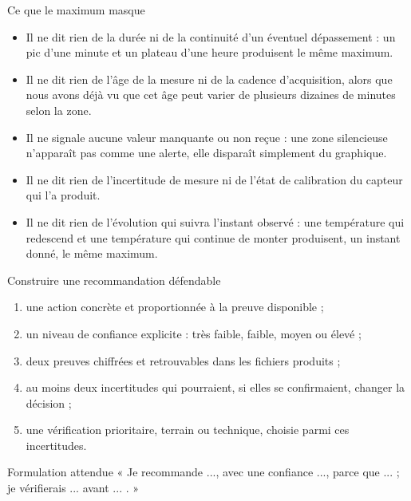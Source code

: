 \documentclass[aspectratio=169]{beamer}
\begin{document}
\begin{frame}{Ce que le maximum masque}
  \begin{itemize}
    \item Il ne dit rien de la durée ni de la continuité d'un éventuel dépassement : un pic d'une minute et un plateau d'une heure produisent le même maximum.
    \item Il ne dit rien de l'âge de la mesure ni de la cadence d'acquisition, alors que nous avons déjà vu que cet âge peut varier de plusieurs dizaines de minutes selon la zone.
    \item Il ne signale aucune valeur manquante ou non reçue : une zone silencieuse n'apparaît pas comme une alerte, elle disparaît simplement du graphique.
    \item Il ne dit rien de l'incertitude de mesure ni de l'état de calibration du capteur qui l'a produit.
    \item Il ne dit rien de l'évolution qui suivra l'instant observé : une température qui redescend et une température qui continue de monter produisent, un instant donné, le même maximum.
  \end{itemize}
\end{frame}

\begin{frame}{Construire une recommandation défendable}
  \begin{enumerate}
    \item une action concrète et proportionnée à la preuve disponible ;
    \item un niveau de confiance explicite : très faible, faible, moyen ou élevé ;
    \item deux preuves chiffrées et retrouvables dans les fichiers produits ;
    \item au moins deux incertitudes qui pourraient, si elles se confirmaient, changer la décision ;
    \item une vérification prioritaire, terrain ou technique, choisie parmi ces incertitudes.
  \end{enumerate}
  \begin{alertblock}{Formulation attendue}
    « Je recommande ..., avec une confiance ..., parce que ... ; je vérifierais ... avant ... . »
  \end{alertblock}
\end{frame}
\end{document}
